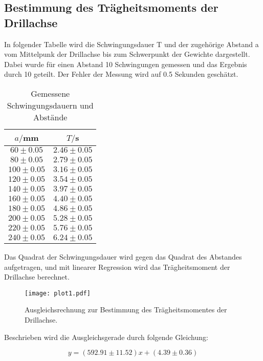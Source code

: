 \subsection{Bestimmung des Trägheitsmoments der Drillachse}
In folgender Tabelle wird die Schwingungsdauer T und der zugehörige Abstand a vom Mittelpunk der Drillachse bis 
zum Schwerpunkt der Gewichte dargestellt. Dabei wurde für einen Abstand 10 Schwingungen gemessen und das Ergebnis
durch 10 geteilt. Der Fehler der Messung wird auf 0.5 Sekunden geschätzt.


\begin{table}[H]
  \centering
  \caption{Gemessene Schwingungsdauern und Abstände}
  \label{tab:Gemessene Schwingungsdauern und Abstände}
  \begin{tabular}{c c}
    \toprule
    $a/$mm & $T/$s \\
    \midrule
     $60 \pm 0.05$ & $2.46 \pm 0.05$ \\ 
     $80 \pm 0.05$ & $2.79 \pm 0.05$ \\
    $100 \pm 0.05$ & $3.16 \pm 0.05$ \\
    $120 \pm 0.05$ & $3.54 \pm 0.05$ \\
    $140 \pm 0.05$ & $3.97 \pm 0.05$ \\
    $160 \pm 0.05$ & $4.40 \pm 0.05$ \\
    $180 \pm 0.05$ & $4.86 \pm 0.05$ \\
    $200 \pm 0.05$ & $5.28 \pm 0.05$ \\
    $220 \pm 0.05$ & $5.76 \pm 0.05$ \\
    $240 \pm 0.05$ & $6.24 \pm 0.05$ \\
    \bottomrule
  \end{tabular}
\end{table} 


Das Quadrat der Schwingungsdauer wird gegen das Quadrat des Abstandes aufgetragen, und mit linearer Regression wird das Trägheitsmoment
der Drillachse berechnet. 

\begin{figure}[H]
  \centering
  \texttt{[image: plot1.pdf]}
  \caption{Ausgleichsrechnung zur Bestimmung des Trägheitsmomentes der Drillachse.}
  \label{fig:plot}
\end{figure}

Beschrieben wird die Ausgleichsgerade durch folgende Gleichung:

\begin{equation}
  y = (592.91 \pm 11.52)x + (4.39 \pm 0.36)
\end{equation}

